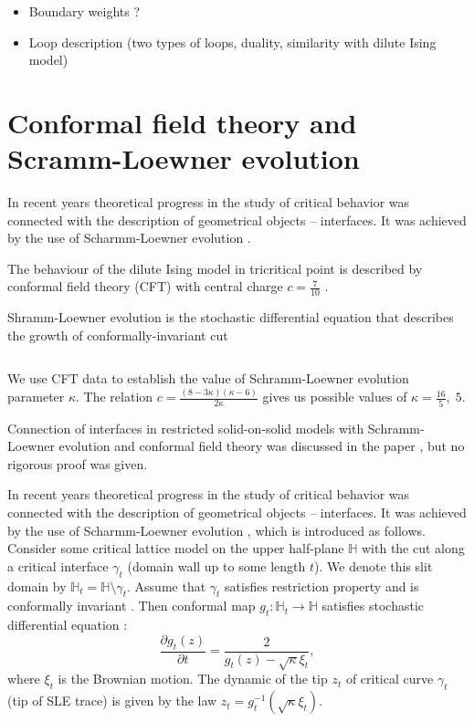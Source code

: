\documentclass[12pt]{article}
\begin{document}
\begin{itemize}
\begin{itemize}
\item Boundary weights ?
\item Loop description (two types of loops, duality, similarity with dilute Ising model) 
\end{itemize}

\section{Conformal field theory and Scramm-Loewner evolution}
\label{sec:conf-field-theory}



In recent
years theoretical progress in the study of critical behavior was connected with the description of
geometrical objects -- interfaces. It was achieved by the use of Scharmm-Loewner evolution \cite{schramm2000scaling}.

The behaviour of the dilute Ising model in tricritical
point is described by conformal field theory (CFT) with central charge $c=\frac{7}{10}$
\cite{friedan1985superconformal}. 

Shramm-Loewner evolution is the stochastic differential equation that describes the growth of
conformally-invariant cut

\begin{equation}
  \label{eq:6}
  
\end{equation}


We use CFT data to establish the value of Schramm-Loewner evolution parameter $\kappa$. The relation
$c=\frac{(8-3\kappa)(\kappa-6)}{2\kappa}$ gives us possible values of $\kappa=\frac{16}{5},\; 5$.

Connection of interfaces in restricted solid-on-solid models with
Schramm-Loewner evolution and conformal field theory was discussed in
the paper \cite{cardy2007ade}, but no rigorous proof was given.

In recent
years theoretical progress in the study of critical behavior was connected with the description of
geometrical objects -- interfaces. It was achieved by the use of
Scharmm-Loewner evolution \cite{schramm2000scaling}, which is
introduced as follows. 
Consider some critical lattice model on the upper half-plane
$\mathbb{H}$ with the cut along a critical interface $\gamma_{t}$
(domain wall up to some length $t$). We denote this slit domain by
$\mathbb{H}_{t}=\mathbb{H}\setminus \gamma_{t}$. Assume that
$\gamma_{t}$ satisfies restriction property and is conformally
invariant \cite{Cardy:2005kh}. Then conformal map
$g_{t}:\mathbb{H}_{t}\to \mathbb{H}$ satisfies stochastic differential
equation \cite{schramm2000scaling}:
\begin{equation}
\label{eq:19}
  \frac{\partial g_t(z)}{\partial t} = \frac{ 2}{g_t(z)-\sqrt{\kappa}\xi_{t}} ,
\end{equation}
where $\xi_{t}$ is the Brownian motion. The dynamic of the tip $z_{t}$ of critical curve $\gamma_{t}$ (tip of SLE trace) is given by the law $z_{t}=g_{t}^{-1}(\sqrt{\kappa}\xi_{t})$. 


\end{itemize}
\end{document}
